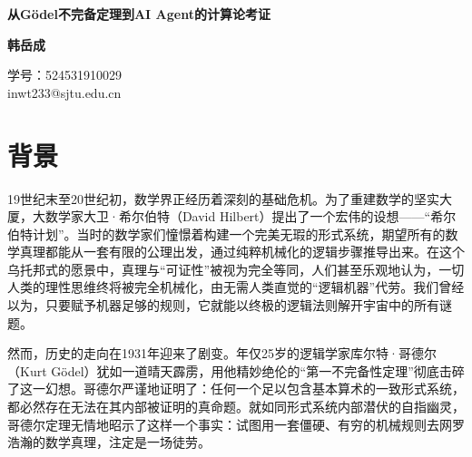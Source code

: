 \documentclass[a4paper,12pt]{ctexart}
\begin{document}
\thispagestyle{plain} %

\begin{center}
    \vspace*{2em}
    {\LARGE \textbf{从Gödel不完备定理到AI Agent的计算论考证}}
    
    \vspace{1.5em}
    
    {\large \textbf{韩岳成}}
    
    \vspace{0.5em}
    {\normalsize 学号：524531910029 \\ inwt233@sjtu.edu.cn}
    
    \vspace{2em}
\end{center}

\begin{abstract}
本论文深入探讨了数学逻辑中的 Gödel 第一不完备定理，旨在阐明形式系统固有的局限性。我们首先构建了形式算术系统 $K_N$，详细阐述了递归函数在其中的可表示性，这是将算法转化为逻辑公式的基础。随后，通过 Gödel 配数法，我们展示了形式系统如何获得“自指”能力，从而能够谈论自身的语法结构。在此基础上，本文构造了著名的 Gödel 句，并给出了不完备定理的构造性证明，揭示了任何包含基本算术的一致形式系统，都必然存在无法在其内部证明的真命题。最后，我们将这一理论洞察延伸至当代人工智能领域，特别是AI Agent的规划与自我反思机制，探讨了形式逻辑的边界对机器智能发展的深远启示，强调了从纯粹形式推理到概率交互式智能范式的转变。
\end{abstract}

\section{背景}
19世纪末至20世纪初，数学界正经历着深刻的基础危机。为了重建数学的坚实大厦，大数学家大卫·希尔伯特（David Hilbert）提出了一个宏伟的设想——“希尔伯特计划”。当时的数学家们憧憬着构建一个完美无瑕的形式系统，期望所有的数学真理都能从一套有限的公理出发，通过纯粹机械化的逻辑步骤推导出来。在这个乌托邦式的愿景中，真理与“可证性”被视为完全等同，人们甚至乐观地认为，一切人类的理性思维终将被完全机械化，由无需人类直觉的“逻辑机器”代劳。我们曾经以为，只要赋予机器足够的规则，它就能以终极的逻辑法则解开宇宙中的所有谜题。

然而，历史的走向在1931年迎来了剧变。年仅25岁的逻辑学家库尔特·哥德尔（Kurt Gödel）犹如一道晴天霹雳，用他精妙绝伦的“第一不完备性定理”彻底击碎了这一幻想。哥德尔严谨地证明了：任何一个足以包含基本算术的一致形式系统，都必然存在无法在其内部被证明的真命题。就如同形式系统内部潜伏的自指幽灵，哥德尔定理无情地昭示了这样一个事实：试图用一套僵硬、有穷的机械规则去网罗浩瀚的数学真理，注定是一场徒劳。
\end{document}
